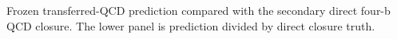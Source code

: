 Frozen transferred-QCD prediction compared with the secondary direct four-b QCD closure. The lower panel is prediction divided by direct closure truth.
